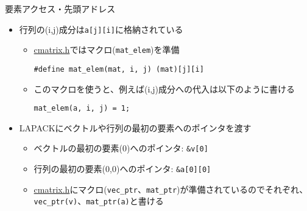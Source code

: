 \begin{frame}[t,fragile]{要素アクセス・先頭アドレス}
  \begin{itemize}
  \item 行列の(i,j)成分は\verb+a[j][i]+に格納されている
    \begin{itemize}
      \item \href{https://github.com/todo-group/computer-experiments/blob/master/exercise/matrix/cmatrix.h}{cmatrix.h}ではマクロ(\verb+mat_elem+)を準備
\begin{lstlisting}
#define mat_elem(mat, i, j) (mat)[j][i]
\end{lstlisting}
\item このマクロを使うと、例えば(i,j)成分への代入は以下のように書ける
\begin{lstlisting}
mat_elem(a, i, j) = 1;
\end{lstlisting}
\end{itemize}
  \item LAPACKにベクトルや行列の最初の要素へのポインタを渡す
    \begin{itemize}
      \item ベクトルの最初の要素(0)へのポインタ: \verb+&v[0]+
      \item 行列の最初の要素(0,0)へのポインタ: \verb+&a[0][0]+
      \item \href{https://github.com/todo-group/computer-experiments/blob/master/exercise/matrix/cmatrix.h}{cmatrix.h}にマクロ({\tt vec\_ptr}、{\tt mat\_ptr})が準備されているのでそれぞれ、{\tt vec\_ptr(v)}、{\tt mat\_ptr(a)}と書ける
    \end{itemize}
  \end{itemize}
\end{frame}
